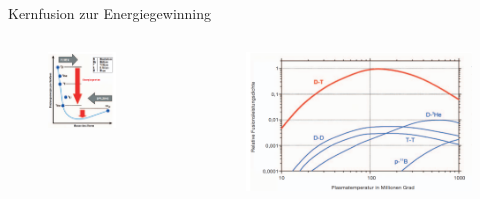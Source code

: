 \documentclass[aspectratio=169,xcolor=dvipsnames,14pt]{beamer}
\begin{document}
\begin{frame}{Kernfusion zur Energiegewinning}
    \begin{columns}
        \begin{column}{0.5\textwidth}
            \begin{figure}
                \centering
                \includegraphics[width=0.7\textwidth]{Bindungsenergie.png}
            \end{figure}
        \end{column}

        \begin{column}{0.5\textwidth}
            \begin{figure}
                \centering
                \includegraphics[width=1\textwidth]{Fusionsleistungsdichte.png}
            \end{figure}
        \end{column}
    \end{columns}
\end{frame}
    
\end{document}
